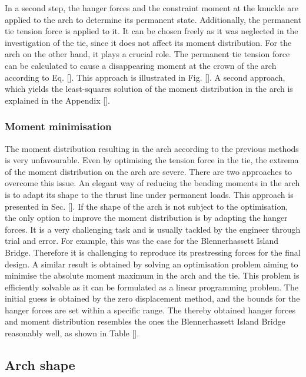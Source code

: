 In a second step, the hanger forces and the constraint moment at the knuckle are applied to the arch to determine its permanent state. Additionally, the permanent tie tension force is applied to it. It can be chosen freely as it was neglected in the investigation of the tie, since it does not affect its moment distribution. For the arch on the other hand, it plays a crucial role. The permanent tie tension force can be calculated to cause a disappearing moment at the crown of the arch according to Eq. []. This approach is illustrated in Fig. []. A second approach, which yields the least-squares solution of the moment distribution in the arch is explained in the Appendix [].



\subsubsection{Moment minimisation}
The moment distribution resulting in the arch according to the previous methods is very unfavourable. Even by optimising the tension force in the tie, the extrema of the moment distribution on the arch are severe. There are two approaches to overcome this issue. An elegant way of reducing the bending moments in the arch is to adapt its shape to the thrust line under permanent loads. This approach is presented in Sec. []. If the shape of the arch is not subject to the optimisation, the only option to improve the moment distribution is by adapting the hanger forces. It is a very challenging task and is usually tackled by the engineer through trial and error. For example, this was the case for the Blennerhassett Island Bridge. Therefore it is challenging to reproduce its prestressing forces for the final design. A similar result is obtained by solving an optimisation problem aiming to minimise the absolute moment maximum in the arch and the tie. This problem is efficiently solvable as it can be formulated as a linear programming problem. The initial guess is obtained by the zero displacement method, and the bounds for the hanger forces are set within a specific range.  The thereby obtained hanger forces and moment distribution resembles the ones the Blennerhassett Island Bridge reasonably well, as shown in Table [].

\subsection{Arch shape}

